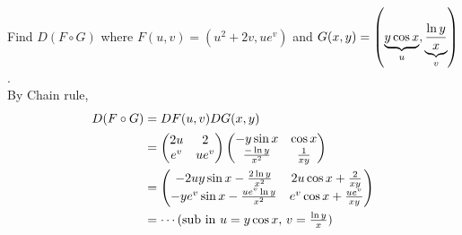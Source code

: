 \documentclass[english, 11pt]{article}
\begin{document}
\begin{exmp}
  Find $D(F \circ G)$ where $F(u,v) = (u^2 + 2v, ue^v)$ and $G(x,y) = \left(\underbrace{y\cos x}_u, \underbrace{\frac{\ln y}{x}}_v \right)$. \\

  By Chain rule,
  \begin{align*}
    D(F \circ G) & = DF(u,v) DG(x,y) \\
    & = \left( \begin{matrix} 2u & 2 \\ e^v & ue^v \end{matrix} \right) \left( \begin{matrix} -y\sin x & \cos x \\ \frac{-\ln y}{x^2} & \frac{1}{xy} \end{matrix} \right) \\
    & = \left( \begin{matrix} -2uy\sin x - \frac{2\ln y}{x^2} & 2u\cos x + \frac{2}{xy} \\ -ye^v\sin x - \frac{ue^v\ln y}{x^2} & e^v\cos x + \frac{ue^v}{xy} \end{matrix} \right) \\
    & = \cdots \mbox{(sub in $u = y\cos x$, $v = \frac{\ln y}{x}$)}
  \end{align*}
\end{exmp}
\end{document}
